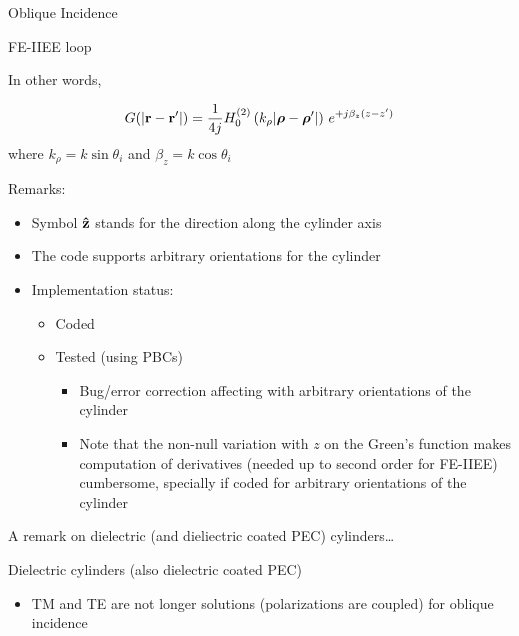 \begin{frame}[allowframebreaks]{Oblique Incidence}
\begin{block}{FE-IIEE loop \insertcontinuationtext}
\begin{itemize}
      \end{itemize}
    \end{block}

    \newpage 
    
    \begin{block}{In other words,}
      
      \begin{equation*}
        G(|\mathbf{r}-\mathbf{r^\prime}|) = \dfrac{1}{4j}
        H_0^{(2)}\left( k_\rho|\boldsymbol{\rho}-\boldsymbol{\rho}^\prime|\right) \,
        e^{+j \beta_z (z-z^\prime)}
      \end{equation*}
      where $k_\rho=k\sin\theta_i$ and $\beta_z=k\cos\theta_i$

      \vbs
      
      Remarks:
      \begin{itemize}
      \item Symbol $\mathbf{\hat{z}}$ stands for the direction along the
        cylinder axis
      \item The code supports arbitrary orientations for the cylinder
      \end{itemize}
    \end{block}

    \begin{itemize}
    \item Implementation status:
      \begin{itemize}
      \item Coded
      \item Tested (using PBCs)
        \begin{itemize}
        \item Bug/error correction affecting with arbitrary orientations of the cylinder
        \item Note that the non-null variation with $z$ on the Green's
          function makes computation of derivatives (needed up to
          second order for FE-IIEE) cumbersome, specially if coded for
          arbitrary orientations of the cylinder
        \end{itemize}
      \end{itemize}
    \end{itemize}
      

    \framebreak %

   \large{A remark on dielectric (and dieliectric coated PEC) cylinders\ldots}
    
   \begin{block}{Dielectric cylinders (also dielectric coated PEC)}
     \begin{itemize}
     \item TM and TE are not longer solutions (\alert{polarizations are
       coupled})  for oblique incidence


\end{itemize}
\end{block}
\end{frame}
